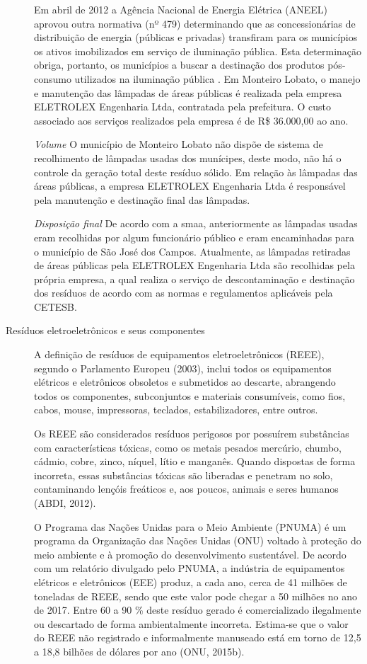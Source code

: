 \begin{description}
	Em abril de 2012 a Agência Nacional de Energia Elétrica (ANEEL) aprovou outra normativa (nº 479) determinando que as concessionárias de distribuição de energia (públicas e privadas) transfiram para os municípios os ativos imobilizados em serviço de iluminação pública. Esta determinação obriga, portanto, os municípios a buscar a destinação dos produtos pós-consumo utilizados na iluminação pública \cite{ANEEL2012}.
	Em Monteiro Lobato, o manejo e manutenção das lâmpadas de áreas públicas é realizada pela empresa ELETROLEX Engenharia Ltda, contratada pela prefeitura. O custo associado aos serviços realizados pela empresa é de R\$ 36.000,00 ao ano.
	
		\subitem \textit{Volume}
		O município de Monteiro Lobato não dispõe de sistema de recolhimento de lâmpadas usadas dos munícipes, deste modo, não há o controle da geração total deste resíduo sólido.
		Em relação às lâmpadas das áreas públicas, a empresa ELETROLEX Engenharia Ltda é responsável pela manutenção e destinação final das lâmpadas.
	
		\subitem \textit{Disposição final}
		De acordo com a \gls{smaa}, anteriormente as lâmpadas usadas eram recolhidas por algum funcionário público e eram encaminhadas para o município de São José dos Campos.
		Atualmente, as lâmpadas retiradas de áreas públicas pela ELETROLEX Engenharia Ltda são recolhidas pela própria empresa, a qual realiza o serviço de descontaminação e destinação dos resíduos de acordo com as normas e regulamentos aplicáveis pela CETESB.
	
	
	\item[Resíduos eletroeletrônicos e seus componentes] A definição de resíduos de equipamentos eletroeletrônicos (REEE), segundo o Parlamento Europeu (2003), inclui todos os equipamentos elétricos e eletrônicos obsoletos e submetidos ao descarte, abrangendo todos os componentes, subconjuntos e materiais consumíveis, como fios, cabos, mouse, impressoras, teclados, estabilizadores, entre outros.
	
	Os REEE são considerados resíduos perigosos por possuírem substâncias com características tóxicas, como os metais pesados mercúrio, chumbo, cádmio, cobre, zinco, níquel, lítio e manganês. Quando dispostas de forma incorreta, essas substâncias tóxicas são liberadas e penetram no solo, contaminando lençóis freáticos e, aos poucos, animais e seres humanos (ABDI, 2012).
	
	O Programa das Nações Unidas para o Meio Ambiente (PNUMA) é um programa da Organização das Nações Unidas (ONU) voltado à proteção do meio ambiente e à promoção do desenvolvimento sustentável. De acordo com um relatório divulgado pelo PNUMA, a indústria de equipamentos elétricos e eletrônicos (EEE) produz, a cada ano, cerca de 41 milhões de toneladas de REEE, sendo que este valor pode chegar a 50 milhões no ano de 2017. Entre 60 a 90 \% deste resíduo gerado é comercializado ilegalmente ou descartado de forma ambientalmente incorreta. Estima-se que o valor do REEE não registrado e informalmente manuseado está em torno de 12,5 a 18,8 bilhões de dólares por ano (ONU, 2015b).
	

\end{description}
